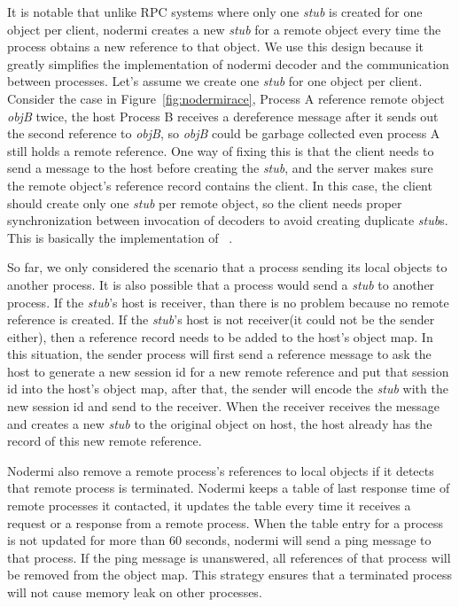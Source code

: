 It is notable that 
unlike RPC systems 
where only one \emph{stub} is created for one object per client,
nodermi creates a new \emph{stub} for a remote object every time
the process obtains a new reference to that object.
We use this design because it
greatly simplifies the implementation of nodermi decoder and
the communication between processes.
Let's assume we create one \emph{stub} for one object per client.
Consider the case in Figure~\ref{fig:nodermirace},
Process A reference remote object \emph{objB} twice,
the host Process B receives a dereference message
after it sends out the second reference to \emph{objB},
so \emph{objB} could be garbage collected even process A still holds a remote
reference.
One way of fixing this is that
the client needs to send a message to the host before creating the \emph{stub},
and the server makes sure the remote object's reference record contains the client.
In this case, the client should create only one \emph{stub} per remote object,
so the client needs proper synchronization between invocation of decoders to
avoid creating duplicate \emph{stub}s. This is basically the implementation
of ~\cite{birrell1993distributed}. %


So far, we only considered the scenario that a process sending its local
objects to another process.
It is also possible that a process would send a \emph{stub} to another process.
If the \emph{stub}'s host is receiver, than there is no problem because no remote
reference is created.
If the \emph{stub}'s host is not receiver(it could not be the sender either),
then 
a reference record needs to be added to the host's object map.
In this situation,
the sender process will first send a reference message to 
ask the host
to generate a new session id for a new remote reference
and put that session id into the host's object map,
after that, 
the sender will encode the \emph{stub} with the new session id
and send to the receiver.
When the receiver receives the message and
creates a new \emph{stub} to the original object on host,
the host already has the record of this new remote reference.


Nodermi also remove a remote process's references to local objects if
it detects that remote process is terminated.
Nodermi keeps a table of last response time of remote processes it contacted,
it updates the table every time it receives a request or a response from a remote 
process. 
When the table entry for a process is not updated for more than 60 seconds, nodermi
will send a ping message to that process.
If the ping message is unanswered, all references of that process will be removed
from the object map.
This strategy ensures that a terminated process will not cause memory leak on
other processes.

